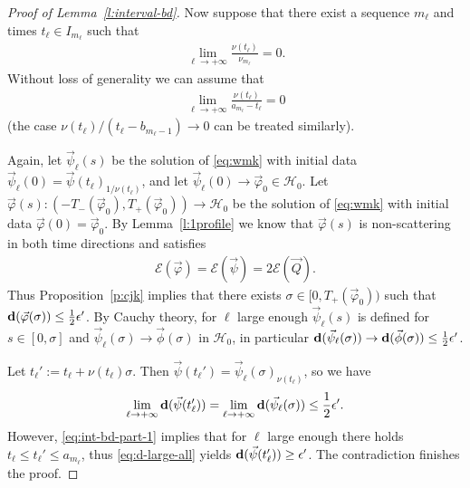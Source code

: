 \documentclass[10pt,reqno]{amsart}
\newcommand{\E}{\mathcal{E}}
\newcommand{\HH}{\mathcal{H}}
\newcommand{\fy}{\varphi}
\newcommand{\EQ}[1]{\begin{equation}\begin{split} #1 \end{split}\end{equation}}
\numberwithin{equation}{section}
\theoremstyle{remark}
\newcommand{\0}{\emptyset}
\newcommand{\eps}{\epsilon}
\newcommand{\bfd}{{\bf d}}
\begin{document}
\begin{proof}[Proof of Lemma~\ref{l:interval-bd}]
Now suppose that there exist a sequence $m_\ell$ and times $t_\ell \in I_{m_\ell}$ such that
\EQ{
\lim_{\ell\to+\infty}\frac{\nu(t_\ell)}{\nu_{m_\ell}} = 0.
}
Without loss of generality we can assume that
\EQ{\label{eq:int-bd-part-2}
\lim_{\ell\to+\infty}\frac{\nu(t_\ell)}{a_{m_\ell} - t_\ell} = 0
}
(the case $\nu(t_\ell)/(t_\ell - b_{m_\ell-1}) \to 0$ can be treated similarly).

Again, let $\vec\psi_\ell(s)$ be the solution of \eqref{eq:wmk} with initial data
$\vec\psi_\ell(0) = \vec\psi(t_\ell)_{1/\nu(t_\ell)}$,
and let $\vec\psi_\ell(0) \to \vec\fy_0 \in \HH_0$.
Let $\vec\fy(s): (-T_-(\vec \fy_0), T_+(\vec \fy_0)) \to \HH_0$ be the solution of \eqref{eq:wmk} with initial data
$\vec\fy(0) = \vec\fy_0$.
By Lemma~\ref{l:1profile} we know that $\vec \fy(s)$ is non-scattering in both time directions and satisfies 
\EQ{
 \E( \vec \fy) = \E( \vec \psi) = 2 \E(\vec Q).
} 
Thus Proposition~\ref{p:cjk} implies that there exists $\sigma \in[0, T_+(\vec\fy_0))$ such that
$ \bfd(\vec\fy(\sigma)) \leq \frac 12 \eps'$.
By Cauchy theory, for $\ell$ large enough $\vec\psi_\ell(s)$ is defined for $s \in [0, \sigma]$
and $\vec\psi_\ell(\sigma) \to \vec\phi(\sigma)$ in $\HH_0$,
in particular $\bfd(\vec\psi_\ell(\sigma)) \to \bfd(\vec\phi(\sigma)) \leq \frac 12 \eps'$.

Let $t_\ell' := t_\ell + \nu(t_\ell)\sigma$. Then $\vec\psi(t_\ell') = \vec\psi_\ell(\sigma)_{\nu(t_\ell)}$, so we have
\EQ{
\lim_{\ell \to +\infty} \bfd(\vec\psi(t_\ell')) = \lim_{\ell\to+\infty} \bfd(\vec\psi_\ell(\sigma)) \leq \frac 12 \eps'.
}
However, \eqref{eq:int-bd-part-1} implies that for $\ell$ large enough there holds
$t_\ell \leq t_\ell' \leq a_{m_\ell}$, thus \eqref{eq:d-large-all} yields
$\bfd(\vec\psi(t_\ell')) \geq \eps'$. The contradiction finishes the proof.
\end{proof}
\end{document}
